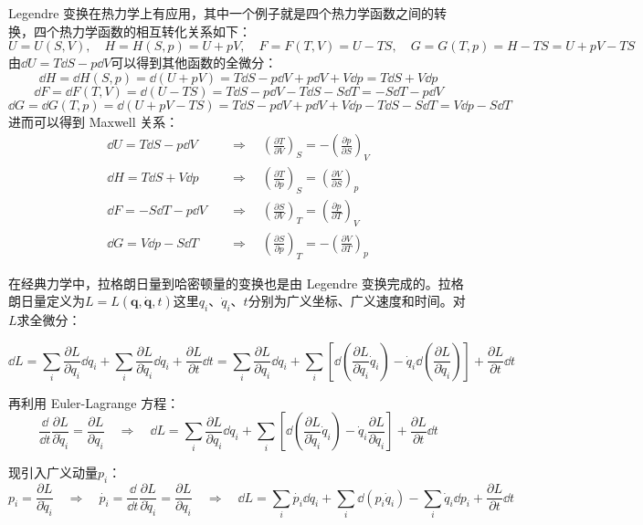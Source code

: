 Legendre 变换在热力学上有应用，其中一个例子就是四个热力学函数之间的转换，四个热力学函数的相互转化关系如下：
\[U=U(S,V), \quad H=H(S,p)=U+pV, \quad F=F(T,V)=U-TS, \quad G=G(T,p)=H-TS=U+pV-TS\]
由$\dd{U}=T\dd{S}-p\dd{V}$可以得到其他函数的全微分：
\[\dd{H}=\dd{H}(S,p)=\dd(U+pV)=T\dd{S}-p\dd{V}+p\dd{V}+V\dd{p}=T\dd{S}+V\dd{p}\]
\[\dd{F}=\dd{F}(T,V)=\dd(U-TS)=T\dd{S}-p\dd{V}-T\dd{S}-S\dd{T}=-S\dd{T}-p\dd{V}\]
\[\dd{G}=\dd{G}(T,p)=\dd(U+pV-TS)=T\dd{S}-p\dd{V}+p\dd{V}+V\dd{p}-T\dd{S}-S\dd{T}=V\dd{p}-S\dd{T}\]
进而可以得到 Maxwell 关系：
\[\begin{aligned}
\dd{U}=T\dd{S}-p\dd{V} \quad &\Rightarrow \quad \left(\frac{\partial T}{\partial V}\right)_S=-\left(\frac{\partial p}{\partial S}\right)_V\\
\dd{H}=T\dd{S}+V\dd{p} \quad &\Rightarrow \quad \left(\frac{\partial T}{\partial p}\right)_S=\left(\frac{\partial V}{\partial S}\right)_p\\
\dd{F}=-S\dd{T}-p\dd{V} \quad &\Rightarrow \quad \left(\frac{\partial S}{\partial V}\right)_T=\left(\frac{\partial p}{\partial T}\right)_V\\
\dd{G}=V\dd{p}-S\dd{T} \quad &\Rightarrow \quad \left(\frac{\partial S}{\partial p}\right)_T=-\left(\frac{\partial V}{\partial T}\right)_p
\end{aligned}\]

在经典力学中，拉格朗日量到哈密顿量的变换也是由 Legendre 变换完成的。拉格朗日量定义为$L=L(\mathbf{q},\dot{\mathbf{q}},t)$这里$q_i$、$\dot{q}_i$、$t$分别为广义坐标、广义速度和时间。对$L$求全微分：

\[\dd{L}=\sum_i\frac{\partial L}{\partial q_i}\dd{q_i}+\sum_i\frac{\partial L}{\partial \dot{q}_i}\dd{\dot{q}_i}+\frac{\partial L}{\partial t}\dd{t}=\sum_i\frac{\partial L}{\partial q_i}\dd{q_i}+\sum_i\left[\dd\left(\frac{\partial L}{\partial \dot{q}_i}\dot{q}_i\right)-\dot{q}_i\dd\left(\frac{\partial L}{\partial \dot{q}_i}\right)\right]+\frac{\partial L}{\partial t}\dd{t}\]

再利用 Euler-Lagrange 方程：
\[\frac{\dd}{\dd t}\frac{\partial L}{\partial \dot{q}_i}=\frac{\partial L}{\partial q_i} \quad \Rightarrow \quad \dd{L}=\sum_i\frac{\partial L}{\partial q_i}\dd{q_i}+\sum_i\left[\dd\left(\frac{\partial L}{\partial \dot{q}_i}\dot{q}_i\right)-\dot{q}_i\frac{\partial L}{\partial q_i}\right]+\frac{\partial L}{\partial t}\dd{t}\]

现引入广义动量$p_i$：
\[p_i=\frac{\partial L}{\partial \dot{q}_i} \quad \Rightarrow \quad \dot{p_i}=\frac{\dd}{\dd t}\frac{\partial L}{\partial \dot{q}_i}=\frac{\partial L}{\partial q_i} \quad \Rightarrow \quad \dd{L}=\sum_i\dot{p_i}\dd{q_i}+\sum_i\dd\left(p_i\dot{q}_i\right)-\sum_i\dot{q}_i\dd{p_i}+\frac{\partial L}{\partial t}\dd{t}\]

